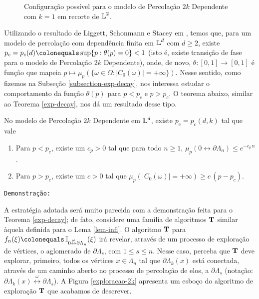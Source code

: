 \begin{figure*}[!htbp]
	\centering
	
	\caption{Configuração possível para o modelo de Percolação $2k$ Dependente com $k = 1$ em recorte de $\operatorname{\mathbb{L}}^2$.}
	\label{configuracao-2k}
\end{figure*}

Utilizando o resultado de Liggett, Schonmann e Stacey em \cite{liggett1997domination}, temos que, para um modelo de percolação com dependência finita em $\operatorname{\mathbb{L}}^d$ com $d \geq 2$, existe $p_c = p_c(d) \colonequals \sup \{p: \theta(p) = 0\} < 1$ (isto é, existe transição de fase para o modelo de Percolação $2k$ Dependente), onde, de novo, $\theta: [0, 1] \longrightarrow [0, 1]$ é função que mapeia $p \mapsto \mu_p(\{\omega \in \Omega : |C_0(\omega)| = +\infty\})$. Nesse sentido, como fizemos na Subseção \ref{subsection-exp-decay}, nos interessa estudar o comportamento da função $\theta(p)$ para $p < p_c$ e $p > p_c$. O teorema abaixo, similar ao Teorema \ref{exp-decay}, nos dá um resultado desse tipo.

\begin{mythm} \label{exp-decay-2k}
	No modelo de Percolação $2k$ Dependente em $\operatorname{\mathbb{L}}^d$, existe $p_c = p_c(d, k)$ tal que vale
	\begin{enumerate}[1.]
		\item Para $p < p_c$, existe um $c_p > 0$ tal que para todo $n \geq 1$, $\mu_p(0 \leftrightarrow \partial\Lambda_n) \leq e^{-c_p \, n}$.
		\item Para $p > p_c$, existe um $c > 0$ tal que $\mu_p(|C_0(\omega)| = +\infty) \geq c \, (p - p_c)$.
	\end{enumerate}
\end{mythm}

\texttt{Demonstração:}

A estratégia adotada será muito parecida com a demonstração feita para o Teorema \ref{exp-decay}; de fato, considere uma família de algoritmos $\text{\textbf{T}}$ similar àquela definida para o Lema \ref{lem-infl}. O algoritmo $\text{\textbf{T}}$ para $f_n(\xi) \colonequals \IX_{0 \overset{\omega}{\leftrightarrow}\partial\Lambda_n}(\xi)$ irá revelar, através de um processo de exploração de vértices, o aglomerado de $\partial\Lambda_{s}$, com $1 \leq s \leq n$. Nesse caso, perceba que $\text{\textbf{T}}$ deve explorar, primeiro, todos os vértices $x \in \Lambda_n$ tal que $\partial\Lambda_k(x)$ está conectada, através de um caminho aberto no processo de percolação de elos, a $\partial\Lambda_s$ (notação: $\partial\Lambda_k(x) \overset{\omega}{\leftrightarrow} \partial\Lambda_s$). A Figura \ref{exploracao-2k} apresenta um esboço do algoritmo de exploração $\text{\textbf{T}}$ que acabamos de descrever.

